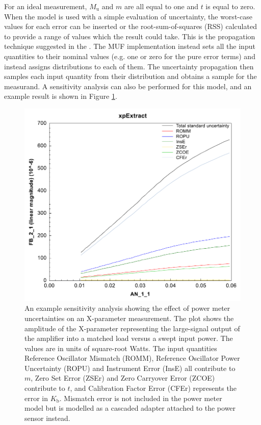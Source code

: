 \documentclass[../thesis/thesis.tex]{subfiles}
\begin{document}
For an ideal measurement, $M_\textrm{u}$ and $m$ are all equal to one and $t$ is equal to zero. When the model is used with a simple evaluation of uncertainty, the worst-case values for each error can be inserted or the root-sum-of-squares (RSS) calculated to provide a range of values which the result could take. This is the propagation technique suggested in the \cite{Keysight_2017}. The MUF implementation instead sets all the input quantities to their nominal values (e.g. one or zero for the pure error terms) and instead assigns distributions to each of them. The uncertainty propagation then samples each input quantity from their distribution and obtains a sample for the measurand. A sensitivity analysis can also be performed for this model, and an example result is shown in Figure \ref{ch4_fig_pmsens}.

\begin{figure}
	\centering
	\includegraphics[width=\textwidth]{pmsens.png}
	\caption[An example sensitivity analysis showing the effect of power meter uncertainties on an X-parameter measurement.]{An example sensitivity analysis showing the effect of power meter uncertainties on an X-parameter measurement. The plot shows the amplitude of the X-parameter representing the large-signal output of the amplifier into a matched load versus a swept input power. The values are in units of square-root Watts. The input quantities Reference Oscillator Mismatch (ROMM), Reference Oscillator Power Uncertainty (ROPU) and Instrument Error (InsE) all contribute to $m$, Zero Set Error (ZSEr) and Zero Carryover Error (ZCOE) contribute to $t$, and Calibration Factor Error (CFEr) represents the error in $K_\textrm{b}$. Mismatch error is not included in the power meter model but is modelled as a cascaded adapter attached to the power sensor instead.}
	\label{ch4_fig_pmsens}
\end{figure}
\end{document}

